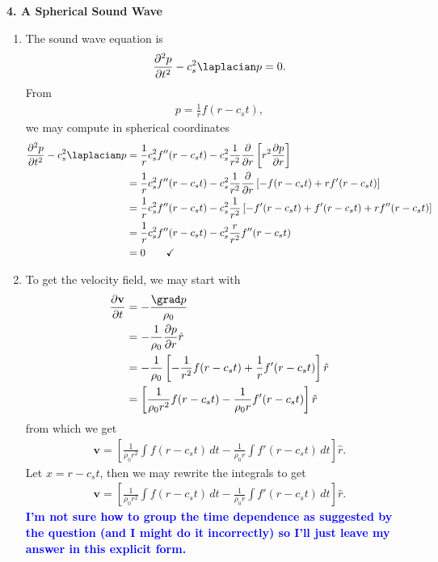 \documentclass{article}
\theoremstyle{definition}
\newcommand{\p}{\partial}
\newcommand{\f}[2]{\frac{#1}{#2}}
\newcommand{\lb}{\left[}
\newcommand{\rb}{\right]}
\begin{document}
\noindent \textbf{4. A Spherical Sound Wave}

\begin{enumerate}[label=(\alph*)]
	\item The sound wave equation is 
	\begin{align*}
	\f{\p^2 p}{\p t^2} - c_s^2 \laplacian p = 0.
	\end{align*}
	From 
	\begin{align*}
	p = \f{1}{r}f(r - c_s t),
	\end{align*}
	we may compute in spherical coordinates
	\begin{align*}
	\f{\p^2 p }{\p t^2} - c_s^2 \laplacian p  
	&= \f{1}{r} c_s^2 f''(r-c_s t) - c_s^2 \f{1}{r^2} \f{\p }{\p r}\lb r^2 \f{\p p }{\p r}  \rb\\ 
	&=  \f{1}{r} c_s^2 f''(r-c_s t) - c_s^2 \f{1}{r^2} \f{\p }{\p r} \lb -f(r-c_s t) + r f'(r-c_s t) \rb \\
	&=  \f{1}{r} c_s^2 f''(r-c_s t) - c_s^2 \f{1}{r^2} \lb -f'(r-c_s t) + f'(r-c_s t) + r f''(r-c_s t) \rb \\
	&=  \f{1}{r} c_s^2 f''(r-c_s t) - c_s^2 \f{r}{r^2} f''(r-c_s t) \\
	&= 0 \quad\quad \checkmark
	\end{align*}
	
	\item To get the velocity field, we may start with
	\begin{align*}
	\f{\p \mathbf{v}}{\p t} &= -\f{\grad p}{\rho_0} \\
	&= -\f{1}{\rho_0} \f{\p p}{\p r} \hat{r}\\
	&= -\f{1}{\rho_0} \lb -\f{1}{r^2}f(r-c_s t) + \f{1}{r} f' (r-c_s t)  \rb \hat{r}\\
	&= \lb \f{1}{\rho_0 r^2} f(r-c_s t) - \f{1}{\rho_0 r} f' (r-c_s t) \rb \hat{r}
	\end{align*}
	from which we get
	\begin{align*}
	\mathbf{v} = \lb \f{1}{\rho_0 r^2} \int f(r-c_s t)\,dt - \f{1}{\rho_0 r }\int f' (r-c_s t) \,dt \rb \hat{r}.
	\end{align*}
	Let $x = r- c_s t$, then we may rewrite the integrals to get
	\begin{align*}
	\mathbf{v} = \lb \f{1}{\rho_0 r^2} \int f(r-c_s t)\,dt - \f{1}{\rho_0 r }\int f' (r-c_s t) \,dt \rb \hat{r}.
	\end{align*}
	\textbf{\textcolor{blue}{I'm not sure how to group the time dependence as suggested by the question (and I might do it incorrectly) so I'll just leave my answer in this explicit form.}}
	

\end{enumerate}
\end{document}
